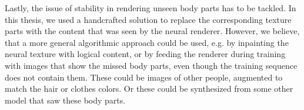 Lastly, the issue of stability in rendering unseen body parts has to be tackled. In this thesis, we used a handcrafted solution to replace the corresponding texture parts with the content that was seen by the neural renderer. However, we believe, that a more general algorithmic approach could be used, e.g. by inpainting the neural texture with logical content, or by feeding the renderer during training with images that show the missed body parts, even though the training sequence does not contain them. These could be images of other people, augmented to match the hair or clothes colors. Or these could be synthesized from some other model that saw these body parts.
